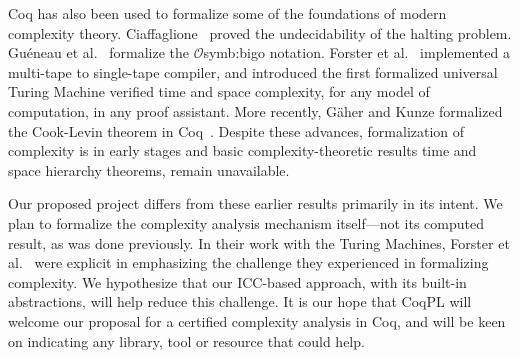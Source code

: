 Coq has also been used to formalize some of the foundations of modern complexity theory.
{Ciaffaglione}~\cite{ciaffaglione2016} proved the undecidability of the halting problem.
{Guéneau et al.}~\cite{gueneau2018} formalize the \(\mathcal{O}\)\gls{symb:bigo} notation.
{Forster et al.}~\cite{forster2020} implemented a multi-tape to single-tape compiler, and introduced the first formalized universal Turing Machine verified \wrt time and space complexity, for any model of computation, in any proof assistant.
More recently, Gäher and Kunze formalized the Cook-Levin theorem in Coq~\cite{gaher2021}.
Despite these advances, formalization of complexity is in early stages and basic complexity-theoretic results \eg time and space hierarchy theorems, remain unavailable.

Our proposed project differs from these earlier results primarily in its intent.
We plan to formalize the complexity analysis mechanism itself---not its computed result, as was done previously.
In their work with the Turing Machines, Forster et al.~\cite{forster2020} were explicit in emphasizing the challenge they experienced in formalizing complexity.
We hypothesize that our ICC-based approach, with \eg its built-in abstractions, will help reduce this challenge.
It is our hope that CoqPL will welcome our proposal for a certified complexity analysis in Coq, and will be keen on indicating any library, tool or resource that could help.
